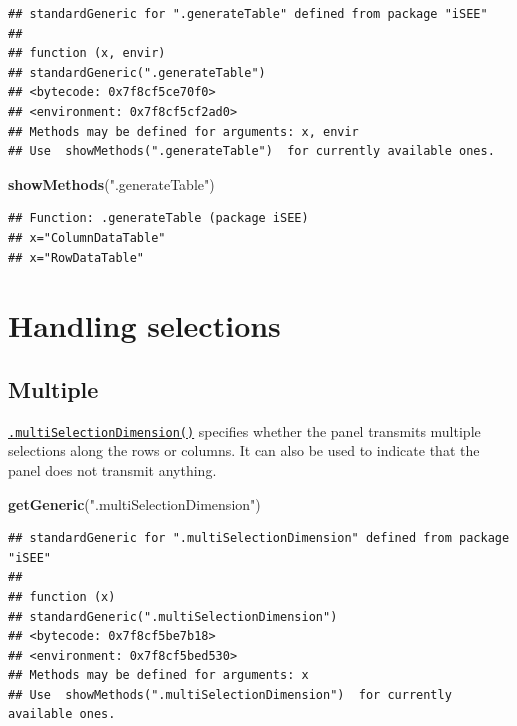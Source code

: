\documentclass[
]{book}
\newenvironment{Shaded}{\begin{snugshade}}{\end{snugshade}}
\newcommand{\KeywordTok}[1]{\textcolor[rgb]{0.13,0.29,0.53}{\textbf{#1}}}
\newcommand{\NormalTok}[1]{#1}
\newcommand{\StringTok}[1]{\textcolor[rgb]{0.31,0.60,0.02}{#1}}
\begin{document}
\begin{verbatim}
## standardGeneric for ".generateTable" defined from package "iSEE"
## 
## function (x, envir) 
## standardGeneric(".generateTable")
## <bytecode: 0x7f8cf5ce70f0>
## <environment: 0x7f8cf5cf2ad0>
## Methods may be defined for arguments: x, envir
## Use  showMethods(".generateTable")  for currently available ones.
\end{verbatim}

\begin{Shaded}
\begin{Highlighting}[]
\KeywordTok{showMethods}\NormalTok{(}\StringTok{".generateTable"}\NormalTok{)}
\end{Highlighting}
\end{Shaded}

\begin{verbatim}
## Function: .generateTable (package iSEE)
## x="ColumnDataTable"
## x="RowDataTable"
\end{verbatim}

\hypertarget{handling-selections}{%
\section{Handling selections}\label{handling-selections}}

\hypertarget{multiple}{%
\subsection{Multiple}\label{multiple}}

\href{https://isee.github.io/iSEE/reference/multi-select-generics.html}{\texttt{.multiSelectionDimension()}} specifies whether the panel transmits multiple selections along the rows or columns.
It can also be used to indicate that the panel does not transmit anything.

\begin{Shaded}
\begin{Highlighting}[]
\KeywordTok{getGeneric}\NormalTok{(}\StringTok{".multiSelectionDimension"}\NormalTok{)}
\end{Highlighting}
\end{Shaded}

\begin{verbatim}
## standardGeneric for ".multiSelectionDimension" defined from package "iSEE"
## 
## function (x) 
## standardGeneric(".multiSelectionDimension")
## <bytecode: 0x7f8cf5be7b18>
## <environment: 0x7f8cf5bed530>
## Methods may be defined for arguments: x
## Use  showMethods(".multiSelectionDimension")  for currently available ones.
\end{verbatim}
\end{document}
